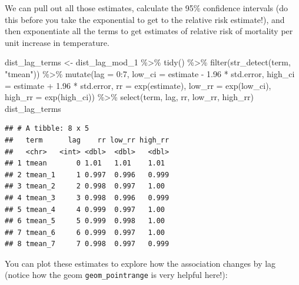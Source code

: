 \documentclass[
]{book}
\newenvironment{Shaded}{\begin{snugshade}}{\end{snugshade}}
\newcommand{\AttributeTok}[1]{\textcolor[rgb]{0.77,0.63,0.00}{#1}}
\newcommand{\DecValTok}[1]{\textcolor[rgb]{0.00,0.00,0.81}{#1}}
\newcommand{\FloatTok}[1]{\textcolor[rgb]{0.00,0.00,0.81}{#1}}
\newcommand{\FunctionTok}[1]{\textcolor[rgb]{0.00,0.00,0.00}{#1}}
\newcommand{\NormalTok}[1]{#1}
\newcommand{\OtherTok}[1]{\textcolor[rgb]{0.56,0.35,0.01}{#1}}
\newcommand{\SpecialCharTok}[1]{\textcolor[rgb]{0.00,0.00,0.00}{#1}}
\newcommand{\StringTok}[1]{\textcolor[rgb]{0.31,0.60,0.02}{#1}}
\begin{document}
We can pull out all those estimates, calculate the 95\% confidence intervals (do this before
you take the exponential to get to the relative risk estimate!), and then exponentiate all
the terms to get estimates of relative risk of mortality per unit increase in temperature.

\begin{Shaded}
\begin{Highlighting}[]
\NormalTok{dist\_lag\_terms }\OtherTok{\textless{}{-}}\NormalTok{ dist\_lag\_mod\_1 }\SpecialCharTok{\%\textgreater{}\%} 
  \FunctionTok{tidy}\NormalTok{() }\SpecialCharTok{\%\textgreater{}\%} 
  \FunctionTok{filter}\NormalTok{(}\FunctionTok{str\_detect}\NormalTok{(term, }\StringTok{"tmean"}\NormalTok{)) }\SpecialCharTok{\%\textgreater{}\%} 
  \FunctionTok{mutate}\NormalTok{(}\AttributeTok{lag =} \DecValTok{0}\SpecialCharTok{:}\DecValTok{7}\NormalTok{, }
         \AttributeTok{low\_ci =}\NormalTok{ estimate }\SpecialCharTok{{-}} \FloatTok{1.96} \SpecialCharTok{*}\NormalTok{ std.error, }
         \AttributeTok{high\_ci =}\NormalTok{ estimate }\SpecialCharTok{+} \FloatTok{1.96} \SpecialCharTok{*}\NormalTok{ std.error, }
         \AttributeTok{rr =} \FunctionTok{exp}\NormalTok{(estimate), }
         \AttributeTok{low\_rr =} \FunctionTok{exp}\NormalTok{(low\_ci), }
         \AttributeTok{high\_rr =} \FunctionTok{exp}\NormalTok{(high\_ci)) }\SpecialCharTok{\%\textgreater{}\%} 
  \FunctionTok{select}\NormalTok{(term, lag, rr, low\_rr, high\_rr)}
\NormalTok{dist\_lag\_terms}
\end{Highlighting}
\end{Shaded}

\begin{verbatim}
## # A tibble: 8 x 5
##   term      lag    rr low_rr high_rr
##   <chr>   <int> <dbl>  <dbl>   <dbl>
## 1 tmean       0 1.01   1.01    1.01 
## 2 tmean_1     1 0.997  0.996   0.999
## 3 tmean_2     2 0.998  0.997   1.00 
## 4 tmean_3     3 0.998  0.996   0.999
## 5 tmean_4     4 0.999  0.997   1.00 
## 6 tmean_5     5 0.999  0.998   1.00 
## 7 tmean_6     6 0.999  0.997   1.00 
## 8 tmean_7     7 0.998  0.997   0.999
\end{verbatim}

You can plot these estimates to explore how the association changes by lag (notice how the
geom \texttt{geom\_pointrange} is very helpful here!):
\end{document}

